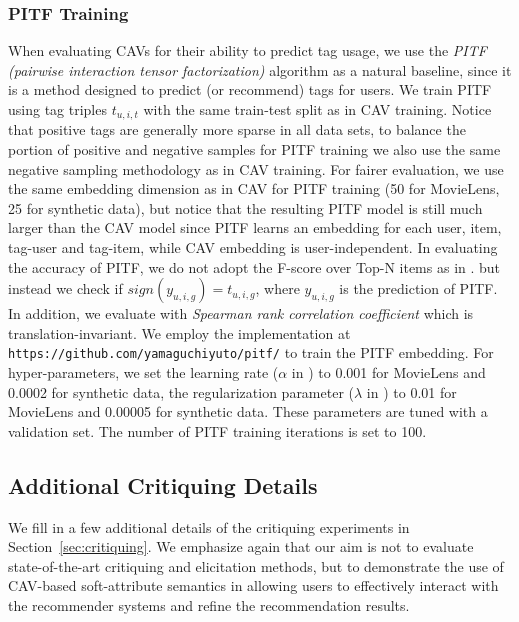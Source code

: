 \documentclass[manuscript,screen,nonacm]{acmart}
\newcommand{\1}{{\mathbf 1}}
\theoremstyle{TheoremNum}
\begin{document}
\subsubsection{PITF Training}
\label{app:pitf}



When evaluating CAVs for their ability to predict tag usage, we use the \emph{PITF (pairwise interaction tensor factorization)} algorithm \cite{rendle2010} as a natural baseline, since it is a method designed to predict (or recommend) tags for users. We train PITF using tag triples $t_{u,i,t}$ with the same train-test split as in CAV training. Notice that positive tags are generally more sparse in all data sets, to balance the portion of positive and negative samples for PITF training we also use the same negative sampling methodology as in CAV training.
For fairer evaluation, we use the same embedding dimension as in CAV for PITF training (50 for MovieLens, 25 for synthetic data), but notice that the resulting PITF model is still much larger than the CAV model since PITF learns an embedding for each user, item, tag-user and tag-item, while CAV embedding is user-independent. In evaluating the accuracy of PITF, we do not adopt the F-score over Top-N items as in \cite{rendle2010}. but instead we check if $sign(y_{u, i, g}) = t_{u,i,g}$, where $y_{u, i, g}$ is the prediction of PITF. In addition, we evaluate with  \emph{Spearman rank correlation coefficient} which is translation-invariant.
We employ the implementation at \texttt{https://github.com/yamaguchiyuto/pitf/} to train the PITF embedding. For hyper-parameters, we set the learning rate ($\alpha$ in \cite{rendle2010}) to 0.001 for MovieLens and 0.0002 for synthetic data, the regularization parameter ($\lambda$ in \cite{rendle2010}) to 0.01 for MovieLens and 0.00005 for synthetic data. These parameters are tuned with a validation set. The number of PITF training iterations is set to 100.


\subsection{Additional Critiquing Details}
\label{app:critiquing}

We fill in a few additional details of the critiquing experiments in Section~\ref{sec:critiquing}. We emphasize again that our aim is not to evaluate state-of-the-art critiquing and elicitation methods, but to demonstrate the use of CAV-based soft-attribute semantics in allowing users to effectively interact with the recommender systems and refine the recommendation results.
\end{document}
